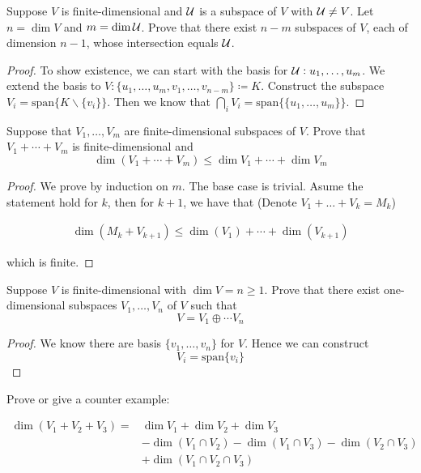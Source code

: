 \documentclass{extarticle}
\begin{document}
\begin{problem}{16}
    Suppose \(V\) is finite-dimensional and \(\mathcal{U}\) is a subspace of \(V\)
    with \(\mathcal{U} \neq V\). Let \(n = \dim V\) and \(m = \dim \mathcal{U}\). Prove that 
    there exist \(n - m\) subspaces of \(V\), each of dimension \(n -1\), whose 
    intersection equals \(\mathcal{U}\). 
\end{problem}


\begin{proof}

    To show existence, we can start with the basis for \(\mathcal{U}: u_1, \ldots, u_m\). 
    We extend the basis to \(V: \{ u_1, \ldots, u_m, v_1, \ldots, v_{n-m}\} \coloneqq K\). Construct 
    the subspace \(V_i = \text{span}\{K \backslash \{v_i\}\}\). Then we know that 
    \(\bigcap_i V_i = \text{span}\{\{u_1, \ldots, u_m\}\}\). 

\end{proof}

\begin{problem}{17}
    Suppose that \(V_1, \ldots, V_m\) are finite-dimensional subspaces of \(V\). Prove that 
    \(V_1 + \cdots + V_m\) is finite-dimensional and 
    \[\dim(V_1 + \cdots + V_m) \leq \dim V_1 + \cdots + \dim V_m\]
\end{problem}

\begin{proof}
We prove by induction on \(m\). The base case is trivial. Asume the statement hold for \(k\),
then for \(k+1\), we have that (Denote \(V_1 + \ldots + V_k = M_k\))

\begin{align*}
    \dim(M_k + V_{k+1}) \leq \dim(V_1) + \cdots +\dim (V_{k+1}) 
\end{align*}

which is finite.

\end{proof}

\begin{problem}{18}
    Suppose \(V\) is finite-dimensional with \(\dim V = n \geq 1\). Prove that there exist 
    one-dimensional subspaces \(V_1, \ldots, V_n\) of \(V\) such that 
    \[V = V_1 \oplus \cdots V_n\]
\end{problem}

\begin{proof}
We know there are basis \(\{v_1, \ldots, v_n\}\) for \(V\). Hence we can construct 
\[V_i = \text{span}\{v_i\}\]
\end{proof}


\begin{problem}{19}
    Prove or give a counter example:

    \begin{align*}
        \dim(V_1 + V_2 + V_3) = &\dim V_1 + \dim V_2 + \dim V_3\\ 
        &-\dim(V_1 \cap V_2) - \dim (V_1 \cap V_3) - \dim (V_2 \cap V_3) \\ 
        &+\dim(V_1 \cap V_2 \cap V_3)
    \end{align*}
\end{problem}
\end{document}

